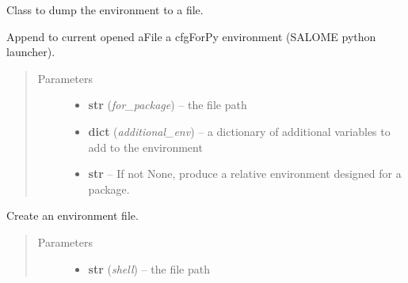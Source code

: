 \documentclass[a4paper,10pt,english]{sphinxmanual}
\begin{document}
\begin{fulllineitems}
\label{commands/apidoc/src:src.environment.FileEnvWriter}
Class to dump the environment to a file.

\begin{fulllineitems}
\label{commands/apidoc/src:src.environment.FileEnvWriter.write_cfgForPy_file}
Append to current opened aFile a cfgForPy 
environment (SALOME python launcher).
\begin{quote}\begin{description}
\item[{Parameters}] \leavevmode\begin{itemize}
\item {} 
\textbf{str} (\emph{for\_package}) -- the file path

\item {} 
\textbf{dict} (\emph{additional\_env}) -- a dictionary of additional variables 
to add to the environment

\item {} 
\textbf{str} -- If not None, produce a relative environment 
designed for a package.

\end{itemize}

\end{description}\end{quote}

\end{fulllineitems}


\begin{fulllineitems}
\label{commands/apidoc/src:src.environment.FileEnvWriter.write_env_file}
Create an environment file.
\begin{quote}\begin{description}
\item[{Parameters}] \leavevmode\begin{itemize}
\item {} 
\textbf{str} (\emph{shell}) -- the file path


\end{itemize}
\end{description}
\end{quote}
\end{fulllineitems}
\end{fulllineitems}
\end{document}
